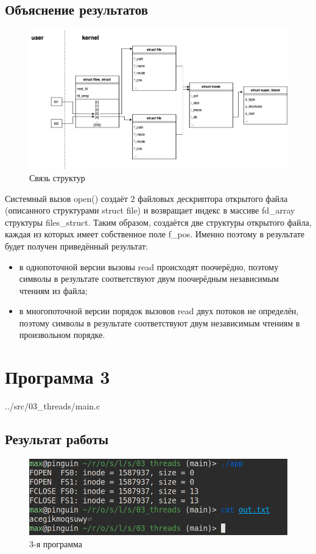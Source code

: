 \subsection*{Объяснение результатов}
\begin{figure}[H]
	\centering
	\includegraphics[scale=0.45]{img/os_lab_05-2.jpg}
	\caption{Связь структур}
	\label{fig:6}
\end{figure}
Системный вызов open() создаёт 2 файловых дескриптора открытого файла (описанного структурами struct file) и возвращает индекс в массиве fd\_array структуры files\_struct. Таким образом, создаётся две структуры открытого файла, каждая из которых имеет собственное поле f\_pos. Именно поэтому в результате будет получен приведённый результат:
\begin{itemize}
	\item в однопоточной версии вызовы read происходят поочерёдно, поэтому символы в результате соответствуют двум поочерёдным независимым чтениям из файла;
	\item в многопоточной версии порядок вызовов read двух потоков не определён, поэтому символы в результате соответствуют двум независимым чтениям в произвольном порядке.
\end{itemize}

\section*{Программа 3}
\begin{lstinputlisting}[label=third,caption=Программа 3, language=c, firstline=1, lastline=29]{../src/03_threads/main.c}
\end{lstinputlisting}

\subsection*{Результат работы}
\begin{figure}[H]
	\centering
	\includegraphics[scale=0.45]{img/res_03.png}
	\caption{3-я программа}
	\label{fig:1}
\end{figure}

